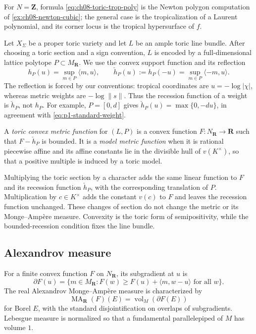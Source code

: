 For $N=\mathbf Z$, formula \eqref{eq:ch08-toric-trop-poly} is the Newton
polygon computation of \cref{ex:ch08-newton-cubic}; the general case is the
tropicalization of a Laurent polynomial, and its corner locus is the
tropical hypersurface of $f$.

Let $X_\Sigma$ be a proper toric variety and let $L$ be an ample toric line
bundle.  After choosing a toric section and a sign convention, $L$ is encoded
by a full-dimensional lattice polytope $P\subset M_{\mathbf R}$.  We use the
convex support function and its reflection
\[
 h_P(u)=\sup_{m\in P}\langle m,u\rangle,
 \qquad
 \check h_P(u):=h_P(-u)=\sup_{m\in P}\langle-m,u\rangle.
\]
The reflection is forced by our conventions: tropical coordinates are
$u=-\log|\chi|$, whereas metric weights are $-\log\|s\|$.  Thus the
recession function of a weight is $\check h_P$, not $h_P$.  For example,
$P=[0,d]$ gives $\check h_P(u)=\max\{0,-du\}$, in agreement with
\eqref{eq:p1-standard-weight}.

\begin{definition}
\label{def:ch08-toric-convex-metric}
A \emph{toric convex metric function} for $(L,P)$ is a convex function
$F:N_{\mathbf R}\to\mathbf R$ such that $F-\check h_P$ is bounded.  It is a
\emph{model metric function} when it is rational piecewise affine and its
affine constants lie in the divisible hull of $v(K^\times)$, so that a
positive multiple is induced by a toric model.
\end{definition}

Multiplying the toric section by a character adds the same linear function
to $F$ and its recession function $\check h_P$, with the corresponding
translation of $P$.  Multiplication by $c\in K^\times$ adds the constant
$v(c)$ to $F$ and leaves the recession function unchanged.  These changes
of section do not change the metric or its Monge--Amp\`ere measure.  Convexity is the
toric form of semipositivity, while the bounded-recession condition fixes the
line bundle.

\subsection{Alexandrov measure}

For a finite convex function $F$ on $N_{\mathbf R}$, its subgradient at $u$
is
\[
 \partial F(u)=
 \{m\in M_{\mathbf R}:F(w)\geq F(u)+\langle m,w-u\rangle
   \text{ for all }w\}.
\]
The real Alexandrov Monge--Amp\`ere measure is characterized by
\begin{equation}
\label{eq:alexandrov-ma}
                 \operatorname{MA}_{\mathbf R}(F)(E)
                 =\operatorname{vol}_M(\partial F(E))
\end{equation}
for Borel $E$, with the standard disjointification on overlaps of
subgradients.  Lebesgue measure is normalized so that a fundamental
parallelepiped of $M$ has volume $1$.

